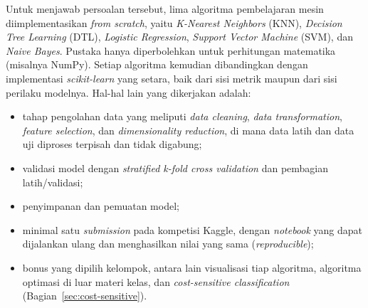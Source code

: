 Untuk menjawab persoalan tersebut, lima algoritma pembelajaran mesin diimplementasikan \textit{from scratch}, yaitu \textit{K-Nearest Neighbors} (KNN), \textit{Decision Tree Learning} (DTL), \textit{Logistic Regression}, \textit{Support Vector Machine} (SVM), dan \textit{Naive Bayes}. Pustaka hanya diperbolehkan untuk perhitungan matematika (misalnya NumPy). Setiap algoritma kemudian dibandingkan dengan implementasi \textit{scikit-learn} yang setara, baik dari sisi metrik maupun dari sisi perilaku modelnya. Hal-hal lain yang dikerjakan adalah:
\begin{itemize}
	\item tahap pengolahan data yang meliputi \textit{data cleaning}, \textit{data transformation}, \textit{feature selection}, dan \textit{dimensionality reduction}, di mana data latih dan data uji diproses terpisah dan tidak digabung;
	\item validasi model dengan \textit{stratified k-fold cross validation} dan pembagian latih/validasi;
	\item penyimpanan dan pemuatan model;
	\item minimal satu \textit{submission} pada kompetisi Kaggle, dengan \textit{notebook} yang dapat dijalankan ulang dan menghasilkan nilai yang sama (\textit{reproducible});
	\item bonus yang dipilih kelompok, antara lain visualisasi tiap algoritma, algoritma optimasi di luar materi kelas, dan \textit{cost-sensitive classification} (Bagian~\ref{sec:cost-sensitive}).
\end{itemize}
